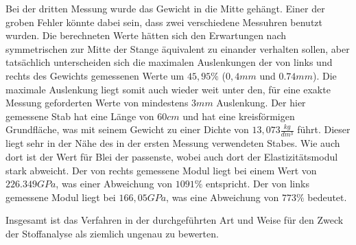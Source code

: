 Bei der dritten Messung wurde das Gewicht in die Mitte gehängt. Einer der groben Fehler könnte dabei sein, dass zwei verschiedene Messuhren benutzt wurden. Die berechneten Werte hätten sich den Erwartungen nach symmetrischen zur Mitte der Stange äquivalent zu einander verhalten sollen, aber tatsächlich unterscheiden sich die maximalen Auslenkungen der von links und rechts des Gewichts gemessenen Werte um $45,95\%$ ($0,4mm$ und $0.74mm$). 
Die maximale Auslenkung liegt somit auch wieder weit unter den, für eine exakte Messung geforderten Werte von mindestens $3mm$ Auslenkung. 
Der hier gemessene Stab hat eine Länge von $60cm$ und hat eine kreisförmigen Grundfläche, was mit seinem Gewicht zu einer Dichte von $13,073 \frac{kg}{dm^3}$ führt. Dieser liegt sehr in der Nähe des in der ersten Messung verwendeten Stabes. Wie auch dort ist der Wert für Blei der passenste, wobei auch dort der Elastizitätsmodul stark abweicht. 
Der von rechts gemessene Modul liegt bei einem Wert von $226.349 GPa$, was einer Abweichung von $1091\%$ entspricht. Der von links gemessene Modul liegt bei $166,05GPa$, was eine Abweichung von $773\%$ bedeutet. 

Insgesamt ist das Verfahren in der durchgeführten Art und Weise für den Zweck der Stoffanalyse als ziemlich ungenau zu bewerten. 


